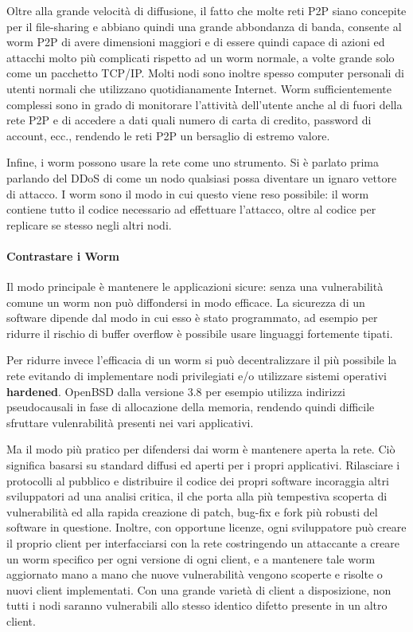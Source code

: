 Oltre alla grande velocità di diffusione, il fatto che molte reti P2P siano concepite per il file-sharing e abbiano quindi una grande abbondanza di banda, consente al worm P2P di avere dimensioni maggiori e di essere quindi capace di azioni ed attacchi molto più complicati rispetto ad un worm normale, a volte grande solo come un pacchetto TCP/IP. Molti nodi sono inoltre spesso computer personali di utenti normali che utilizzano quotidianamente Internet. Worm sufficientemente complessi sono in grado di monitorare l'attività dell'utente anche al di fuori della rete P2P e di accedere a dati quali numero di carta di credito, password di account, ecc., rendendo le reti P2P un bersaglio di estremo valore.

Infine, i worm possono usare la rete come uno strumento. Si è parlato prima parlando del DDoS di come un nodo qualsiasi possa diventare un ignaro vettore di attacco. I worm sono il modo in cui questo viene reso possibile: il worm contiene tutto il codice necessario ad effettuare l'attacco, oltre al codice per replicare se stesso negli altri nodi.

\paragraph{Contrastare i Worm}\label{contrastare-i-worm}

Il modo principale è mantenere le applicazioni sicure: senza una vulnerabilità comune un worm non può diffondersi in modo efficace. La sicurezza di un software dipende dal modo in cui esso è stato programmato, ad esempio per ridurre il rischio di buffer overflow è possibile usare linguaggi fortemente tipati.

Per ridurre invece l'efficacia di un worm si può decentralizzare il più possibile la rete evitando di implementare nodi privilegiati e/o utilizzare sistemi operativi \textbf{hardened}. OpenBSD dalla versione 3.8 per esempio utilizza indirizzi pseudocausali in fase di allocazione della memoria, rendendo quindi difficile sfruttare vulenrabilità presenti nei vari applicativi.

Ma il modo più pratico per difendersi dai worm è mantenere aperta la rete. Ciò significa basarsi su standard diffusi ed aperti per i propri applicativi. Rilasciare i protocolli al pubblico e distribuire il codice dei propri software incoraggia altri sviluppatori ad una analisi critica, il che porta alla più tempestiva scoperta di vulnerabilità ed alla rapida creazione di patch, bug-fix e fork più robusti del software in questione. Inoltre, con opportune licenze, ogni sviluppatore può creare il proprio client per interfacciarsi con la rete costringendo un attaccante a creare un worm specifico per ogni versione di ogni client, e a mantenere tale worm aggiornato mano a mano che nuove vulnerabilità vengono scoperte e risolte o nuovi client implementati. Con una grande varietà di client a disposizione, non tutti i nodi saranno vulnerabili allo stesso identico difetto presente in un altro client.

